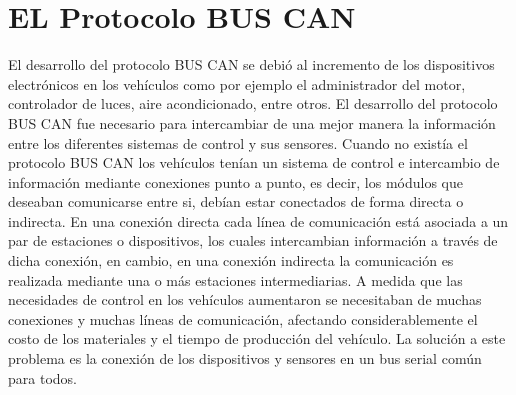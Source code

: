 \section {EL Protocolo BUS CAN}

El desarrollo del  protocolo BUS CAN se debió al incremento de los dispositivos electrónicos en los vehículos como por ejemplo el administrador del motor, controlador de luces, aire acondicionado, entre otros.  
El desarrollo del protocolo BUS CAN fue necesario para intercambiar de una mejor manera la información entre los diferentes sistemas de control y sus sensores.
Cuando no existía el protocolo BUS CAN los vehículos tenían un sistema de control e intercambio de información mediante conexiones punto a punto, es decir, los módulos que deseaban comunicarse entre si, debían estar conectados de forma directa o indirecta.
En una conexión  directa  cada línea de comunicación está asociada a un par de estaciones o dispositivos, los cuales intercambian información a través de dicha conexión, en cambio, en una conexión indirecta  la comunicación es realizada  mediante una o más estaciones intermediarias.
A medida que las necesidades de control en los vehículos  aumentaron se necesitaban de muchas conexiones y muchas líneas de comunicación, afectando considerablemente el costo de los materiales y el tiempo de producción del vehículo. 
La solución a este problema es la conexión de los dispositivos y sensores en un bus serial común para todos.


